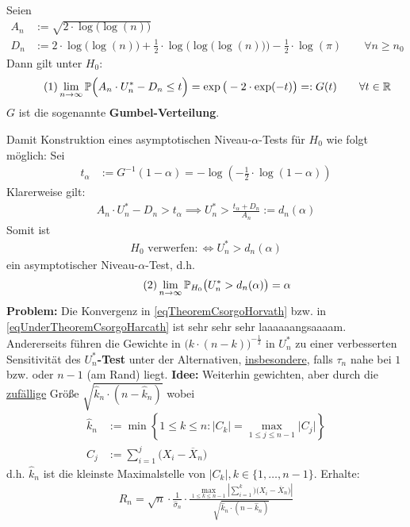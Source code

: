 \begin{thm}\label{theoremCH} %
	Seien
	\begin{align*}
		A_n&:=\sqrt{2\cdot\log\big(\log(n)\big)}\\
		D_n&:=2\cdot\log\big(\log(n)\big)+\frac{1}{2}\cdot\log\Big(\log\big(\log(n)\big)\Big)-\frac{1}{2}\cdot\log(\pi)\qquad\forall n\geq n_0
	\end{align*}
	Dann gilt unter $H_0$:
	\begin{align}\label{eqTheoremCsorgoHorvath}\tag{1}
		\lim\limits_{n\to\infty}\mathbb{P}\Big(A_n\cdot U_n^\ast-D_n\leq t\Big)=\exp\big(-2\cdot\exp(-t)\big)=:G(t)
		\qquad\forall t\in\mathbb{R}
	\end{align}
	$G$ ist die sogenannte \textbf{Gumbel-Verteilung}.
\end{thm}

Damit Konstruktion eines asymptotischen Niveau-$\alpha$-Tests für $H_0$ wie folgt möglich: Sei
\begin{align*}
	t_\alpha&:=G^{-1}(1-\alpha)=-\log\left(-\frac{1}{2}\cdot\log(1-\alpha)\right)
\end{align*}
Klarerweise gilt:
\begin{align*}
	A_n\cdot U_n^\ast-D_n>t_\alpha\implies U_n^\ast>\frac{t_\alpha+D_n}{A_n}:=d_n(\alpha)
\end{align*}
Somit ist 
\begin{align*}
	H_0\text{ verwerfen}:\Longleftrightarrow U_n^\ast>d_n(\alpha)
\end{align*}
ein asymptotischer Niveau-$\alpha$-Test, d.h.
\begin{align}\label{eqUnderTheoremCsorgoHarcath}\tag{2}
	\lim\limits_{n\to\infty}\mathbb{P}_{H_0}\big(U_n^\ast>d_n(\alpha)\big)=\alpha
\end{align}
\textbf{Problem:} Die Konvergenz in \eqref{eqTheoremCsorgoHorvath} bzw. in \eqref{eqUnderTheoremCsorgoHarcath} ist sehr sehr sehr laaaaaangsaaaam. %
Andererseits führen die Gewichte in $\big(k\cdot(n-k)\big)^{-\frac{1}{2}}$ in $U_n^\ast$ zu einer verbesserten Sensitivität des \textbf{$U_n^\ast$-Test} unter der Alternativen, \underline{insbesondere}, falls $\tau_n$ nahe bei $1$ bzw. oder $n-1$ (am Rand) liegt.\nl
\textbf{Idee:} Weiterhin gewichten, aber durch die \ul{zufällige} Größe $\sqrt{\hat{k}_n\cdot(n-\hat{k}_n)}$ wobei 
\begin{align*}
	\hat{k}_n&:=\min\left\lbrace 1\leq k\leq n:\big|C_k\big|=\max\limits_{1\leq j\leq n-1}\big|C_j\big|\right\rbrace\\
	C_j&:=\sum\limits_{i=1}^j \big(X_i-\overline{X}_n\big)
\end{align*}
d.h. $\hat{k}_n$ ist die kleinste Maximalstelle von $|C_k|,k\in\lbrace1,\ldots,n-1\rbrace$. Erhalte:
\begin{align*}
	R_n=\sqrt{n}\cdot\frac{1}{\hat{\sigma}_n}\cdot\frac{\max\limits_{1\leq k\leq n-1}\left|\sum\limits_{i=1}^k\big)(X_i-\overline{X}_n\big)\right|}{\sqrt{\hat{k}_n\cdot(n-\hat{k}_n)}}
\end{align*}

